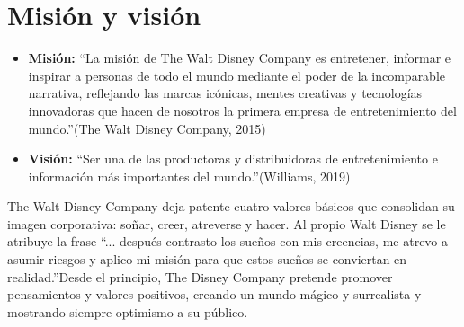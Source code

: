 \section{Misión y visión}

\begin{itemize}

\item
\textbf{Misión:} \textquotedblleft La misión de The Walt Disney Company es entretener, informar e inspirar a personas de todo el mundo mediante el poder de la incomparable narrativa, reflejando las marcas icónicas, mentes creativas y tecnologías innovadoras que hacen de nosotros la primera empresa de entretenimiento del mundo.\textquotedblright\space(The Walt Disney Company, 2015)

\item
\textbf{Visión:} \textquotedblleft Ser una de las productoras y distribuidoras de entretenimiento e información más importantes del mundo.\textquotedblright\space(Williams, 2019)

\end{itemize}

The Walt Disney Company deja patente cuatro valores básicos que consolidan su imagen corporativa: soñar, creer, atreverse y hacer. Al propio Walt Disney se le atribuye la frase \textquotedblleft ... después contrasto los sueños con mis creencias, me atrevo a asumir riesgos y aplico mi misión para que estos sueños se conviertan en realidad.\textquotedblright\space Desde el principio, The Disney Company pretende promover pensamientos y valores positivos, creando un mundo mágico y surrealista y mostrando siempre optimismo a su público.